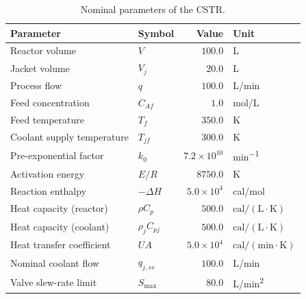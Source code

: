 \begin{table}[t]
\centering
\caption{Nominal parameters of the CSTR.}\label{tab:cstr_parameters}
\footnotesize
\setlength{\tabcolsep}{3pt}
\begin{tabular}{llrl}
\toprule
Parameter & Symbol & Value & Unit \\
\midrule
Reactor volume & $V$ & $100.0$ & \si{L} \\
Jacket volume & $V_j$ & $20.0$ & \si{L} \\
Process flow & $q$ & $100.0$ & \si{L/min} \\
Feed concentration & $C_{Af}$ & $1.0$ & \si{mol/L} \\
Feed temperature & $T_f$ & $350.0$ & \si{K} \\
Coolant supply temperature & $T_{jf}$ & $300.0$ & \si{K} \\
Pre-exponential factor & $k_0$ & $7.2 \times 10^{10}$ & \si{min^{-1}} \\
Activation energy & $E/R$ & $8750.0$ & \si{K} \\
Reaction enthalpy & $-\Delta H$ & $5.0 \times 10^4$ & \si{cal/mol} \\
Heat capacity (reactor) & $\rho C_p$ & $500.0$ & $\text{cal}/(\text{L}\cdot\text{K})$ \\
Heat capacity (coolant) & $\rho_j C_{pj}$ & $500.0$ & $\text{cal}/(\text{L}\cdot\text{K})$ \\
Heat transfer coefficient & $UA$ & $5.0 \times 10^4$ & $\text{cal}/(\text{min}\cdot\text{K})$ \\
Nominal coolant flow & $q_{j,ss}$ & $100.0$ & \si{L/min} \\
Valve slew-rate limit & $S_{\max}$ & $80.0$ & \si{L/min^2} \\
\bottomrule
\end{tabular}
\end{table}

